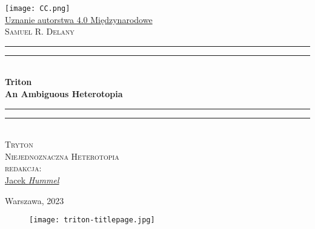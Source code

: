 \documentclass[oneside,polish,11pt,rmheadings]{mwbk}
\begin{document}
\pagestyle{empty}
\begin{titlepage} %
	\newcommand{\HRule}{\rule{\linewidth}{0.5mm}} %
	
	\center %
	\normalsize 
	\texttt{[image: CC.png]}\\
\href{https://creativecommons.org/licenses/by/4.0/deed.pl}{ Uznanie autorstwa 4.0 Międzynarodowe}\\[1.5cm]
	
	\textsc{\Huge Samuel R. Delany}\\[0.5cm] %
	
	\rule{\textwidth}{1.6pt}\vspace*{-\baselineskip}\vspace*{2pt} %
	\rule{\textwidth}{0.4pt}\\[0.4cm] %
		
	{\huge\bfseries Triton}\\[0.4cm] %
    {\huge\bfseries An Ambiguous Heterotopia}\\[0.1cm] %

	\rule{\textwidth}{0.4pt}\vspace*{-\baselineskip}\vspace{3.2pt} %
	\rule{\textwidth}{1.6pt}\\[0.5cm] %

	
    \textsc{\Large Tryton}\\[0.4cm] %
	\textsc{\large Niejednoznaczna Heterotopia}\\[2.5cm] %
	

	{\large\textsc{redakcja:}}\\
	 \href{mailto:theskymyladythesky@zoho.eu}{Jacek \textit{Hummel}}
	\vfill
		

	{\large Warszawa, 2023} %
\end{titlepage}


\begin{figure} 
\begin{center}
\texttt{[image: triton-titlepage.jpg]}
\end{center}
\end{figure}
\end{document}
